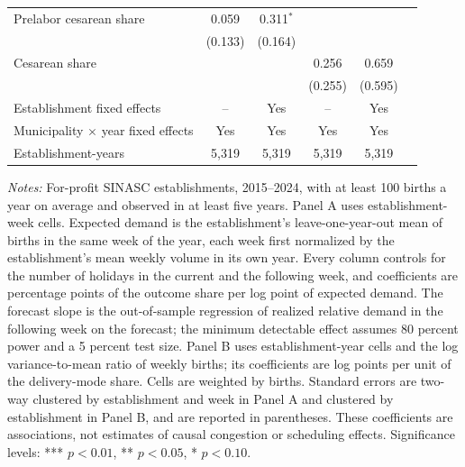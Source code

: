 \begin{table}[H]
{\begin{tabular}{lccccc}
Prelabor cesarean share & 0.059 & 0.311$^{*}$ &  &  & \\
 & (0.133) & (0.164) &  &  & \\
\addlinespace[2pt]
Cesarean share &  &  & 0.256 & 0.659 & \\
 &  &  & (0.255) & (0.595) & \\
\addlinespace[2pt]
Establishment fixed effects & -- & Yes & -- & Yes & \\
Municipality $\times$ year fixed effects & Yes & Yes & Yes & Yes & \\
Establishment-years & 5,319 & 5,319 & 5,319 & 5,319 & \\
\bottomrule
\end{tabular}
}
\begin{minipage}{\linewidth}\footnotesize
\textit{Notes:} For-profit SINASC establishments, 2015--2024, with at least 100 births a year on average and observed in at least five years. Panel A uses establishment-week cells. Expected demand is the establishment's leave-one-year-out mean of births in the same week of the year, each week first normalized by the establishment's mean weekly volume in its own year. Every column controls for the number of holidays in the current and the following week, and coefficients are percentage points of the outcome share per log point of expected demand. The forecast slope is the out-of-sample regression of realized relative demand in the following week on the forecast; the minimum detectable effect assumes 80 percent power and a 5 percent test size. Panel B uses establishment-year cells and the log variance-to-mean ratio of weekly births; its coefficients are log points per unit of the delivery-mode share. Cells are weighted by births. Standard errors are two-way clustered by establishment and week in Panel A and clustered by establishment in Panel B, and are reported in parentheses. These coefficients are associations, not estimates of causal congestion or scheduling effects.
\newline
\footnotesize Significance levels: *** $p<0.01$, ** $p<0.05$, * $p<0.10$.
\end{minipage}
\end{table}
